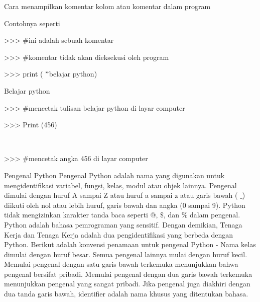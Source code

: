 \vspace{14pt}
\noindent 
{\fontsize{14pt}{14pt}\selectfont Cara menampilkan komentar kolom atau komentar dalam program \\} \par
\vspace{14pt}
\noindent 
{\fontsize{14pt}{14pt}\selectfont Contohnya seperti  \\} \par
\vspace{14pt}
\noindent 
{\fontsize{14pt}{14pt}\selectfont >>>  $  \#  $ini adalah sebuah komentar \\} \par
\vspace{14pt}
\noindent 
{\fontsize{14pt}{14pt}\selectfont >>> $  \#  $komentar tidak akan dieksekusi oleh program \\} \par
\vspace{14pt}
\noindent 
{\fontsize{14pt}{14pt}\selectfont >>> print ( $ " $belajar python) \\} \par
\vspace{14pt}
\noindent 
{\fontsize{14pt}{14pt}\selectfont Belajar python \\} \par
\vspace{14pt}
\noindent 
{\fontsize{14pt}{14pt}\selectfont >>> $  \#  $mencetak tulisan belajar python di layar computer \\} \par
\noindent 
{\fontsize{14pt}{14pt}\selectfont >>> Print (456) \\} \par
\noindent 
{\fontsize{14pt}{14pt} \\} \par
\noindent 
{\fontsize{14pt}{14pt}\selectfont >>> $  \#  $mencetak angka 456 di layar computer \\} \par
\vspace{14pt}
\vspace{14pt}
\vspace{14pt}
\noindent 
{\fontsize{14pt}{14pt}\selectfont Pengenal Python Pengenal Python adalah nama yang digunakan untuk mengidentifikasi variabel, fungsi, kelas, modul atau objek lainnya. Pengenal dimulai dengan huruf A sampai Z atau huruf a sampai z atau garis bawah ( $  \_  $) diikuti oleh nol atau lebih huruf, garis bawah dan angka (0 sampai 9). Python tidak mengizinkan karakter tanda baca seperti @,  $  \$  $, dan $  \%  $ dalam pengenal. Python adalah bahasa pemrograman yang sensitif. Dengan demikian, Tenaga Kerja dan Tenaga Kerja adalah dua pengidentifikasi yang berbeda dengan Python. Berikut adalah konvensi penamaan untuk pengenal Python - Nama kelas dimulai dengan huruf besar. Semua pengenal lainnya mulai dengan huruf kecil. Memulai pengenal dengan satu garis bawah terkemuka menunjukkan bahwa pengenal bersifat pribadi. Memulai pengenal dengan dua garis bawah terkemuka menunjukkan pengenal yang sangat pribadi. Jika pengenal juga diakhiri dengan dua tanda garis bawah, identifier adalah nama khusus yang ditentukan bahasa. \\} \par

